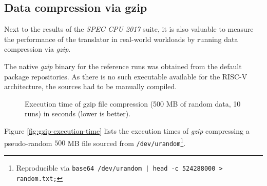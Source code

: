 \subsection{Data compression via gzip}
Next to the results of the \textit{SPEC CPU 2017} suite, it is also valuable to measure the performance of the translator in real-world workloads by running data compression via \textit{gzip}.

The native \textit{gzip} binary for the reference runs was obtained from the default package repositories.
As there is no such executable available for the RISC-V architecture, the sources had to be manually compiled.

\begin{figure}[h]
	\centering
	\caption[Execution time of gzip compression (500 MB, 10 runs)]%
	{Execution time of gzip file compression (500 MB of random data, 10 runs) in seconds (lower is better).}
	\label{fig:gzip-execution-time}
\end{figure}

Figure \vref{fig:gzip-execution-time} lists the execution times of \textit{gzip} compressing a pseudo-random $500$ MB file sourced from \texttt{/dev/urandom}\footnote{Reproducible via \texttt{base64 /dev/urandom | head -c 524288000 > random.txt;}}.

